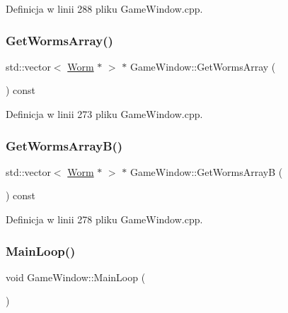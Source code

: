 Definicja w linii 288 pliku Game\+Window.\+cpp.

\mbox{\label{class_game_window_a7535403f5d3ab3ffe22c711665102052}} 
\subsubsection{\texorpdfstring{Get\+Worms\+Array()}{GetWormsArray()}}
{\footnotesize\ttfamily std\+::vector$<$ \mbox{\hyperlink{class_worm}{Worm}} $\ast$ $>$ $\ast$ Game\+Window\+::\+Get\+Worms\+Array (\begin{DoxyParamCaption}{ }\end{DoxyParamCaption}) const}



Definicja w linii 273 pliku Game\+Window.\+cpp.

\mbox{\label{class_game_window_ab9695e10e5a991a9df920911402b9272}} 
\subsubsection{\texorpdfstring{Get\+Worms\+Array\+B()}{GetWormsArrayB()}}
{\footnotesize\ttfamily std\+::vector$<$ \mbox{\hyperlink{class_worm}{Worm}} $\ast$ $>$ $\ast$ Game\+Window\+::\+Get\+Worms\+ArrayB (\begin{DoxyParamCaption}{ }\end{DoxyParamCaption}) const}



Definicja w linii 278 pliku Game\+Window.\+cpp.

\mbox{\label{class_game_window_a7dcdd3731da278a522c59a72ecee77b3}} 
\subsubsection{\texorpdfstring{Main\+Loop()}{MainLoop()}}
{\footnotesize\ttfamily void Game\+Window\+::\+Main\+Loop (\begin{DoxyParamCaption}{ }\end{DoxyParamCaption})}



